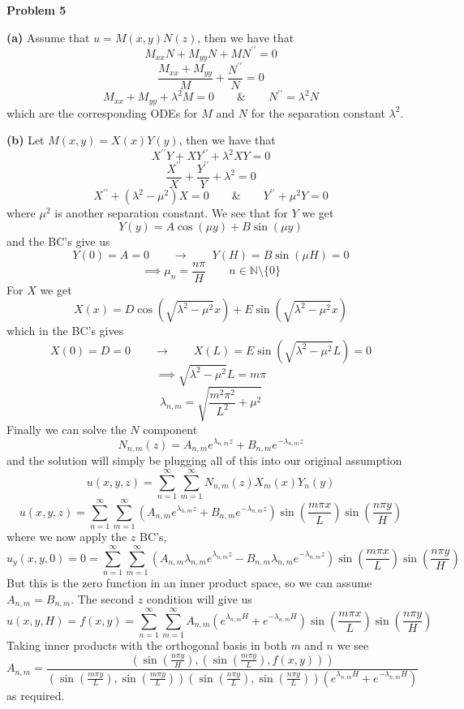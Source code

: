 \documentclass[10pt]{article}
\begin{document}
\newpage
\textbf{Problem 5}

\textbf{(a)}
Assume that $u = M(x,y)N(z)$, then we have that
$$M_{xx}N + M_{yy}N + MN^{\prime\prime} = 0$$
$$\frac{M_{xx} + M_{yy}}{M} + \frac{N^{\prime\prime}}{N} = 0$$
$$M_{xx} + M_{yy} + \lambda^{2}M = 0 \hspace{2em} \& \hspace{2em} N^{\prime\prime} = \lambda^{2}N$$
which are the corresponding ODEs for $M$ and $N$ for the separation constant $\lambda^{2}$.

\textbf{(b)}
Let $M(x,y) = X(x)Y(y)$, then we have that
$$X^{\prime\prime}Y + XY^{\prime\prime} + \lambda^{2}XY = 0$$
$$\frac{X^{\prime\prime}}{X} + \frac{Y^{\prime\prime}}{Y} + \lambda^{2} = 0$$
$$X^{\prime\prime} + (\lambda^{2}-\mu^{2})X = 0 \hspace{2em} \& \hspace{2em} Y^{\prime\prime} + \mu^{2}Y = 0$$
where $\mu^{2}$ is another separation constant. We see that for $Y$ we get
$$Y(y) = A\cos(\mu y) + B\sin(\mu y)$$
and the BC's give us
$$Y(0) = A = 0 \hspace{2em} \to \hspace{2em} Y(H) = B\sin(\mu H) = 0$$
$$\implies \mu_{n} = \frac{n\pi}{H} \hspace{2em} n\in\mathbb{N}\setminus\{0\}$$
For $X$ we get
$$X(x) = D\cos\left(\sqrt{\lambda^{2} - \mu^{2}}x\right) + E\sin\left(\sqrt{\lambda^{2} - \mu^{2}}x\right)$$
which in the BC's gives
$$X(0) = D = 0 \hspace{2em} \to \hspace{2em} X(L) = E\sin\left(\sqrt{\lambda^{2}-\mu^{2}}L\right) = 0$$
$$\implies \sqrt{\lambda^{2}-\mu^{2}}L = m\pi$$
$$\lambda_{n,m} = \sqrt{\frac{m^{2}\pi^{2}}{L^{2}} + \mu^{2}}$$
Finally we can solve the $N$ component
$$N_{n,m}(z) = A_{n,m}e^{\lambda_{n,m}z} + B_{n,m}e^{-\lambda_{n,m}z}$$
and the solution will simply be plugging all of this into our original assumption
$$u(x,y,z) = \sum_{n=1}^{\infty}\sum_{m=1}^{\infty}N_{n,m}(z)X_{m}(x)Y_{n}(y)$$
$$u(x,y,z) = \sum_{n=1}^{\infty}\sum_{m=1}^{\infty}\left(A_{n,m}e^{\lambda_{n,m}z} + B_{n,m}e^{-\lambda_{n,m}z}\right)\sin\left(\frac{m\pi x}{L}\right)\sin\left(\frac{n\pi y}{H}\right)$$
where we now apply the $z$ BC's,
$$u_{y}(x,y,0) = 0 = \sum_{n=1}^{\infty}\sum_{m=1}^{\infty}\left(A_{n,m}\lambda_{n,m}e^{\lambda_{n,m}z} - B_{n,m}\lambda_{n,m}e^{-\lambda_{n,m}z}\right)\sin\left(\frac{m\pi x}{L}\right)\sin\left(\frac{n\pi y}{H}\right)$$
But this is the zero function in an inner product space, so we can assume $A_{n,m} = B_{n,m}$. The second $z$ condition will give us
$$u(x,y,H) = f(x,y) =  \sum_{n=1}^{\infty}\sum_{m=1}^{\infty}A_{n,m}\left(e^{\lambda_{n,m}H} +e^{-\lambda_{n,m}H}\right)\sin\left(\frac{m\pi x}{L}\right)\sin\left(\frac{n\pi y}{H}\right)$$
Taking inner products with the orthogonal basis in both $m$ and $n$ we see
$$A_{n,m} = \frac{\left(\sin\left(\frac{n\pi y}{H}\right),\left(\sin\left(\frac{m\pi y}{L}\right),f(x,y)\right)\right)}{\left(\sin\left(\frac{m\pi y}{L}\right),\sin\left(\frac{m\pi y}{L}\right)\right)\left(\sin\left(\frac{n\pi y}{L}\right),\sin\left(\frac{n\pi y}{L}\right)\right)\left(e^{\lambda_{n,m}H} +e^{-\lambda_{n,m}H}\right)}$$
as required.
\end{document}
